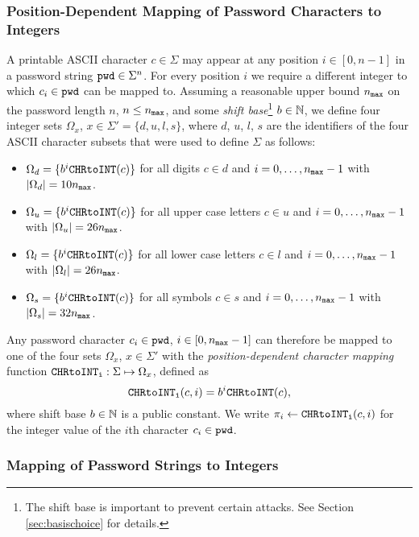 \subsubsection{Position-Dependent Mapping of Password Characters to Integers}
A printable \ac{ASCII}  character $c\in\Sigma$ may appear at any position $i\in[0, n-1]$ in a password string $\mathtt{pwd}\in\Sigma^n$. For every position $i$ we require a different integer to which $c_i\in\mathtt{pwd}$ can be mapped to.
Assuming a reasonable upper bound ${n_\mathtt{max}}$ on the password length $n$, \ie $n\leq {n_\mathtt{max}}$, and some \emph{shift base}\footnote{The shift base is important to prevent certain attacks. See Section \ref{sec:basischoice} for details.} $b\in\mathbb{N}$, we define four integer sets $\Omega_x$, $x\in\Sigma' = \{d, u, l, s\}$, where $d$, $u$, $l$, $s$ are the identifiers of the four \ac{ASCII}  character subsets that were used to define $\Sigma$ as follows:
\begin{itemize}
	\item $\Omega_d = \{b^i\texttt{CHRtoINT}(c)\}$ for all digits $c\in d$ and $i=0,\ldots,{n_\mathtt{max}}-1$ with $|\Omega_d|= 10{n_\mathtt{max}}$.
	\item $\Omega_u = \{b^i\texttt{CHRtoINT}(c)\}$ for all upper case letters $c\in u$ and $i=0,\ldots,{n_\mathtt{max}}-1$ with $|\Omega_u|= 26{n_\mathtt{max}}$.
	\item $\Omega_l = \{b^i\texttt{CHRtoINT}(c)\}$ for all lower case letters $c\in l$ and $i=0,\ldots,{n_\mathtt{max}}-1$ with $|\Omega_l|= 26{n_\mathtt{max}}$.
	\item $\Omega_s = \{b^i\texttt{CHRtoINT}(c)\}$ for all symbols $c\in s$ and $i=0,\ldots,{n_\mathtt{max}}-1$ with $|\Omega_s|= 32{n_\mathtt{max}}$.
\end{itemize}
Any password character $c_i\in\mathtt{pwd}$, $i\in[0,{n_\mathtt{max}}-1]$ can therefore be mapped to one of the four sets $\Omega_x$, $x\in\Sigma'$ with the \emph{position-dependent character mapping} function $\texttt{CHRtoINT}_\texttt{i}:\Sigma\mapsto\Omega_{x}$, defined as
\[
\texttt{CHRtoINT}_\texttt{i}(c, i)= b^i\texttt{CHRtoINT}(c),
\]
where shift base $b\in\mathbb{N}$ is a public constant.
We write $\pi_i \gets \texttt{CHRtoINT}_\texttt{i}(c, i)$ for the integer value of the $i$th character $c_i\in\mathtt{pwd}$.

\subsubsection{Mapping of Password Strings to Integers}


